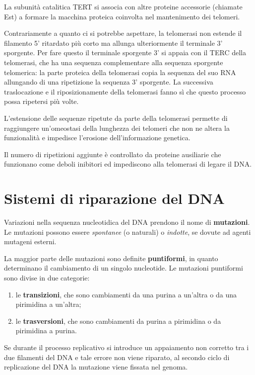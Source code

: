 \documentclass[11pt]{book}
\begin{document}
La subunità catalitica TERT si associa con altre proteine accessorie
(chiamate Est) a formare la macchina proteica coinvolta nel mantenimento
dei telomeri.

Contrariamente a quanto ci si potrebbe aspettare, la telomerasi non
estende il filamento 5' ritardato più corto ma allunga ulteriormente il
terminale 3' sporgente. Per fare questo il terminale sporgente 3' si
appaia con il TERC della telomerasi, che ha una sequenza complementare
alla sequenza sporgente telomerica: la parte proteica della telomerasi
copia la sequenza del suo RNA allungando di una ripetizione la sequenza
3' sporgente. La successiva traslocazione e il riposizionamente della
telomerasi fanno sì che questo processo possa ripetersi più volte.

L'estensione delle sequenze ripetute da parte della telomerasi permette
di raggiungere un'omeostasi della lunghezza dei telomeri che non ne
altera la funzionalità e impedisce l'erosione dell'informazione
genetica.

Il numero di ripetizioni aggiunte è controllato da proteine ausiliarie
che funzionano come deboli inibitori ed impediscono alla telomerasi di
legare il DNA.

\section{Sistemi di riparazione del
DNA}\label{sistemi-di-riparazione-del-dna}

Variazioni nella sequenza nucleotidica del DNA prendono il nome di
\textbf{mutazioni}. Le mutazioni possono essere \emph{spontanee} (o
naturali) o \emph{indotte}, se dovute ad agenti mutageni esterni.

La maggior parte delle mutazioni sono definite \textbf{puntiformi}, in
quanto determinano il cambiamento di un singolo nucleotide. Le mutazioni
puntiformi sono divise in due categorie:

\begin{enumerate}
\def\labelenumi{\arabic{enumi}.}
\itemsep1pt\parskip0pt
\item
  le \textbf{transizioni}, che sono cambiamenti da una purina a un'altra
  o da una pirimidina a un'altra;
\item
  le \textbf{trasversioni}, che sono cambiamenti da purina a pirimidina
  o da pirimidina a purina.
\end{enumerate}

Se durante il processo replicativo si introduce un appaiamento non
corretto tra i due filamenti del DNA e tale errore non viene riparato,
al secondo ciclo di replicazione del DNA la mutazione viene fissata nel
genoma.
\end{document}
